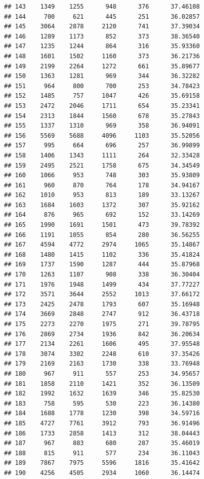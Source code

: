 \documentclass[
]{article}
\begin{document}
\begin{verbatim}
## 143    1349    1255      948      376      37.46108
## 144     700     621      445      251      36.02857
## 145    3064    2878     2120      741      37.39034
## 146    1289    1173      852      373      38.36540
## 147    1235    1244      864      316      35.93360
## 148    1601    1502     1160      373      36.21736
## 149    2199    2264     1272      661      35.89677
## 150    1363    1281      969      344      36.32282
## 151     964     800      700      253      34.78423
## 152    1485     757     1047      426      35.69158
## 153    2472    2046     1711      654      35.23341
## 154    2313    1844     1560      678      35.27843
## 155    1337    1310      969      358      36.94091
## 156    5569    5688     4096     1103      35.52056
## 157     995     664      696      257      36.99899
## 158    1406    1343     1111      264      32.33428
## 159    2495    2521     1758      675      34.34549
## 160    1066     953      748      303      35.93809
## 161     960     870      764      178      34.94167
## 162    1010     953      813      189      33.13267
## 163    1684    1603     1372      307      35.92162
## 164     876     965      692      152      33.14269
## 165    1990    1691     1501      473      39.78392
## 166    1191    1055      854      280      36.56255
## 167    4594    4772     2974     1065      35.14867
## 168    1480    1415     1102      336      35.41824
## 169    1737    1590     1287      444      35.87968
## 170    1263    1107      908      338      36.30404
## 171    1976    1948     1499      434      37.77227
## 172    3571    3644     2552     1013      37.66172
## 173    2425    2478     1793      607      35.16948
## 174    3669    2848     2747      912      36.43718
## 175    2273    2270     1975      271      39.78795
## 176    2869    2734     1936      842      36.20634
## 177    2134    2261     1606      495      37.95548
## 178    3074    3302     2248      610      37.35426
## 179    2169    2163     1730      338      33.76948
## 180     967     911      557      253      34.95657
## 181    1858    2110     1421      352      36.13509
## 182    1992    1632     1639      346      35.82530
## 183     758     595      530      223      36.14380
## 184    1688    1778     1230      398      34.59716
## 185    4727    7761     3912      793      36.91496
## 186    1733    2858     1413      312      38.04443
## 187     967     883      680      287      35.46019
## 188     815     911      577      234      36.11043
## 189    7867    7975     5596     1816      35.41642
## 190    4256    4505     2934     1060      36.14474

\end{verbatim}
\end{document}

